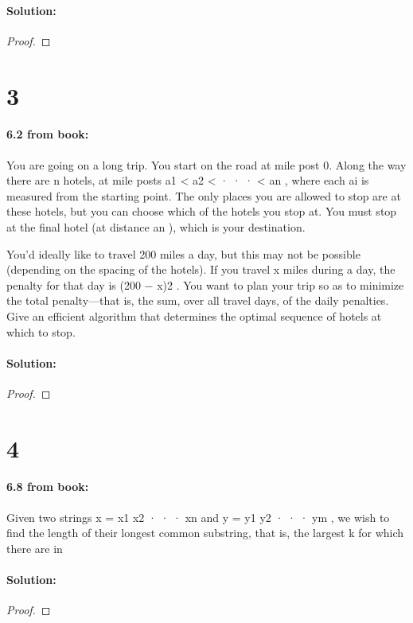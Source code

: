\documentclass[12pt]{article}
\begin{document}
\paragraph{Solution:}
\begin{proof}

\end{proof}

\section*{3}
\paragraph{6.2 from book:}
You are going on a long trip. You start on the road at mile post 0. Along the way there are n
hotels, at mile posts a1 < a2 < · · · < an , where each ai is measured from the starting point. The
only places you are allowed to stop are at these hotels, but you can choose which of the hotels
you stop at. You must stop at the final hotel (at distance an ), which is your destination.

You’d ideally like to travel 200 miles a day, but this may not be possible (depending on the spacing
of the hotels). If you travel x miles during a day, the penalty for that day is (200 − x)2 . You want
to plan your trip so as to minimize the total penalty—that is, the sum, over all travel days, of the
daily penalties.
Give an efficient algorithm that determines the optimal sequence of hotels at which to stop.
\paragraph{Solution:}
\begin{proof}

\end{proof}

\section*{4}
\paragraph{6.8 from book:}
Given two strings x = x1 x2 · · · xn and y = y1 y2 · · · ym , we wish to find the length of their longest
common substring, that is, the largest k for which there are in

\paragraph{Solution:}
\begin{proof}

\end{proof}
\end{document}
